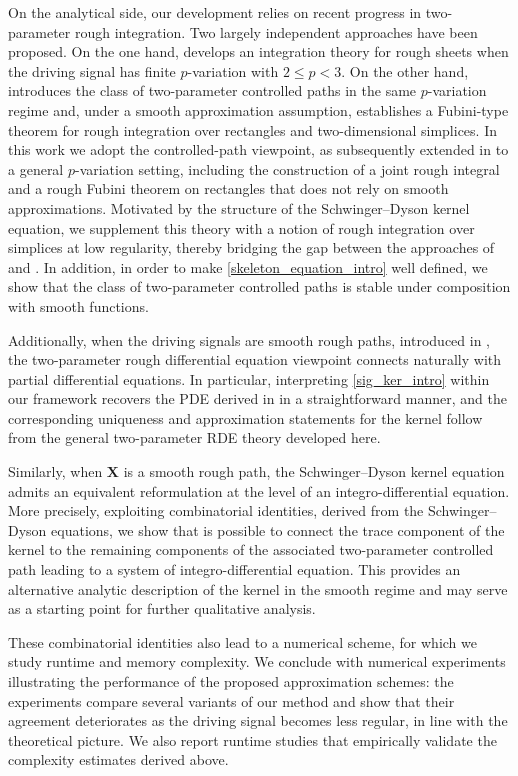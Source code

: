 \documentclass{article}%
\begin{document}
On the analytical side, our development relies on recent progress in two-parameter rough integration.
Two largely independent approaches have been proposed.
On the one hand, \cite{chouk2014rough} develops an integration theory for rough sheets when the driving signal has finite $p$-variation with $2\le p<3$.
On the other hand, \cite{gerasimovivcs2019hormander} introduces the class of two-parameter controlled paths in the same $p$-variation regime and, under a smooth approximation assumption, establishes a Fubini-type theorem for rough integration over rectangles and two-dimensional simplices.
In this work we adopt the controlled-path viewpoint, as subsequently extended in \cite{cass2023fubini} to a general $p$-variation setting, including the construction of a joint rough integral and a rough Fubini theorem on rectangles that does not rely on smooth approximations.
Motivated by the structure of the Schwinger--Dyson kernel equation, we supplement this theory with a notion of rough integration over simplices at low regularity, thereby bridging the gap between the approaches of \cite{cass2023fubini} and \cite{gerasimovivcs2019hormander}.
In addition, in order to make \eqref{skeleton_equation_intro} well defined, we show that the class of two-parameter controlled paths is stable under composition with smooth functions.

Additionally, when the driving signals are smooth rough paths, introduced in \cite{bellingeri2022smooth}, the two-parameter rough differential equation viewpoint connects naturally with partial differential equations.
In particular, interpreting \eqref{sig_ker_intro} within our framework recovers the PDE derived in \cite{lemercier2024log} in a straightforward manner, and the corresponding uniqueness and approximation statements for the kernel follow from the general two-parameter RDE theory developed here.

Similarly, when $\mathbf{X}$ is a smooth rough path, the Schwinger--Dyson kernel equation admits an equivalent reformulation at the level of an integro-differential equation.
More precisely, exploiting combinatorial identities, derived  from the Schwinger--Dyson equations, we show that is possible to connect the trace component of the kernel to the remaining components of the associated two-parameter controlled path leading to a system of integro-differential equation.
This provides an alternative analytic description of the kernel in the smooth regime and may serve as a starting point for further qualitative analysis.

These combinatorial identities also lead to a numerical scheme, for which we study runtime and memory complexity.
We conclude with numerical experiments illustrating the performance of the proposed approximation schemes: the experiments compare several variants of our method and show that their agreement deteriorates as the driving signal becomes less regular, in line with the theoretical picture.
We also report runtime studies that empirically validate the complexity estimates derived above.
\end{document}
